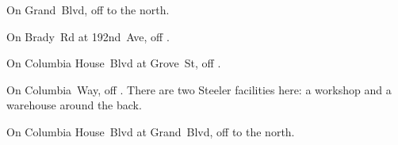 
\begin{LocationList}

On Grand~Blvd, off   to the north.

On Brady~Rd at 192nd~Ave, off  .

\Location{\GasStation \Gas}
On Columbia House~Blvd at Grove~St, off  .

On Columbia~Way, off  .
There are two Steeler facilities here: a workshop and a warehouse around the back.

On Columbia House~Blvd at Grand~Blvd, off   to the north.

\end{LocationList}

